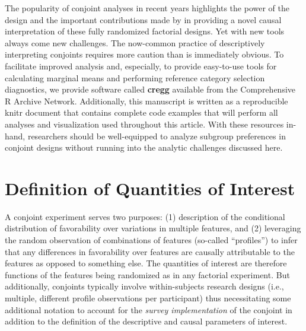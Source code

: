 \documentclass[a4paper,12pt]{article}\usepackage[]{graphicx}\usepackage[]{color}
\begin{document}
The popularity of conjoint analyses in recent years highlights the power of the design and the important contributions made by \citet{HainmuellerHopkinsYamamoto2014} in providing a novel causal interpretation of these fully randomized factorial designs. Yet with new tools always come new challenges. The now-common practice of descriptively interpreting conjoints requires more caution than is immediately obvious. To facilitate improved analysis and, especially, to provide easy-to-use tools for calculating marginal means and performing reference category selection diagnostics, we provide software called \textbf{cregg} \citep{Leeper2018cregg} available from the Comprehensive R Archive Network. Additionally, this manuscript is written as a reproducible knitr document \citep{Xie2015} that contains complete code examples that will perform all analyses and visualization used throughout this article. With these resources in-hand, researchers should be well-equipped to analyze subgroup preferences in conjoint designs without running into the analytic challenges discussed here.




\singlespacing


\clearpage


\appendix
\tableofcontents



\clearpage

\section{Definition of Quantities of Interest}\label{app:quantities}

A conjoint experiment serves two purposes: (1) description of the conditional distribution of favorability over variations in multiple features, and (2) leveraging the random observation of combinations of features (so-called ``profiles'') to infer that any differences in favorability over features are causally attributable to the features as opposed to something else. The quantities of interest are therefore functions of the features being randomized as in any factorial experiment. But additionally, conjoints typically involve within-subjects research designs (i.e., multiple, different profile observations per participant) thus necessitating some additional notation to account for the \textit{survey implementation} of the conjoint in addition to the definition of the descriptive and causal parameters of interest.
\end{document}
